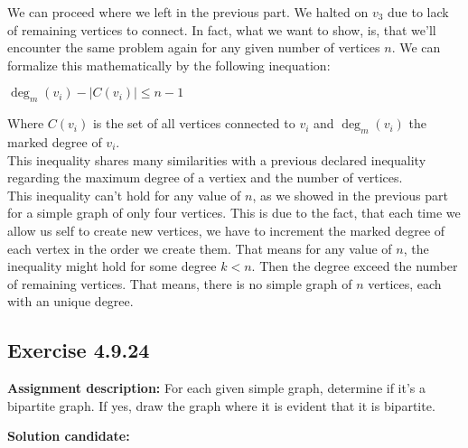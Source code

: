 \documentclass{report}
\newcommand{\cent}[1]{\begin{center}#1\end{center}}
\newcommand{\assignmentDescription}{\textbf{Assignment description: }}
\newcommand{\solution}{\textbf{Solution candidate: }}
\newcommand{\Exercise}[1]{\subsection{Exercise #1}}
\newcommand{\defaultEnumerateLabel}{\textbf{\alph*.}}
\begin{document}
\begin{enumerate}[label=\defaultEnumerateLabel]
		We can proceed where we left in the previous part. We halted on $v_3$ due to lack of remaining vertices to connect. In fact, what we want to show, is, that we'll encounter the same problem again for any given number of vertices $n$. We can formalize this mathematically by the following inequation:
		
		\cent{$\deg_m(v_i) - | C(v_i)| \leq n -1$}
		
		Where $C(v_i)$ is the set of all vertices connected to $v_i$ and $\deg_m(v_i)$ the marked degree of $v_i$.\\
		
		This inequality shares many similarities with a previous declared inequality regarding the maximum degree of a vertiex and the number of vertices.\\
		
		This inequality can't hold for any value of $n$, as we showed in the previous part for a simple graph of only four vertices. This is due to the fact, that each time we allow us self to create new vertices, we have to increment the marked degree of each vertex in the order we create them. That means for any value of $n$, the inequality might hold for some degree $k < n$. Then the degree exceed the number of remaining vertices. That means, there is no simple graph of $n$ vertices, each with an unique degree.
		
	\end{enumerate}
	
	\Exercise{4.9.24}
	
	\assignmentDescription
	For each given simple graph, determine if it's a bipartite graph. If yes, draw the graph where it is evident that it is bipartite.
	
	\solution
	
\end{document}
